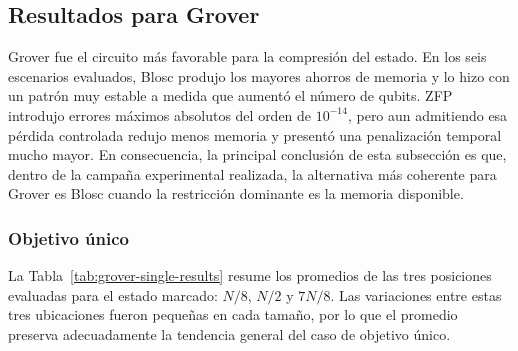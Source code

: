 \subsection{Resultados para Grover}

Grover fue el circuito más favorable para la compresión del estado. En los seis escenarios
evaluados, Blosc produjo los mayores ahorros de memoria y lo hizo con un patrón muy estable a
medida que aumentó el número de qubits. ZFP introdujo errores máximos absolutos del orden de
$10^{-14}$, pero aun admitiendo esa pérdida controlada redujo menos memoria y presentó una
penalización temporal mucho mayor. En consecuencia, la principal conclusión
de esta subsección es que, dentro de la campaña experimental realizada, la alternativa más
coherente para Grover es Blosc cuando la restricción dominante es la memoria disponible.

\subsubsection{Objetivo único}

La Tabla~\ref{tab:grover-single-results} resume los promedios de las tres posiciones
evaluadas para el estado marcado: $N/8$, $N/2$ y $7N/8$. Las variaciones entre estas tres
ubicaciones fueron pequeñas en cada tamaño, por lo que el promedio preserva adecuadamente la
tendencia general del caso de objetivo único.

\begin{table}[H]
    \centering
    \small
    \setlength{\tabcolsep}{3pt}
    \caption{Grover con objetivo único: promedios sobre las posiciones $N/8$, $N/2$ y $7N/8$}
    \label{tab:grover-single-results}
\end{table}

